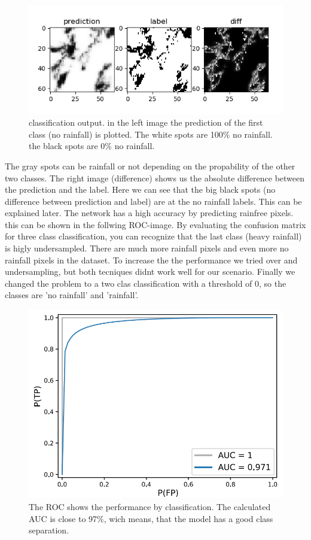 \documentclass[oneside]{htwg-report}
\begin{document}
\begin{figure}[ht]
\centering
\includegraphics[width=\linewidth]{../pics/categorical_crossentropy_hidden-softmax_output-softmax_above_3072}
\caption{classification output. in the left image the prediction of the first class (no rainfall) is plotted. The white spots are 100\% no rainfall. the black spots are 0\% no rainfall.}
\end{figure}


The gray spots can be rainfall or not depending on the propability of the other two classes. The right image (difference) shows us the absolute difference between the prediction and the label.
Here we can see that the big black spots (no difference between prediction and label) are at the no rainfall labels. This can be explained later. 
The network has a high accuracy by predicting rainfree pixels. this can be shown in the follwing ROC-image. 
By evaluating the confusion matrix for three class classification, you can recognize that the last class (heavy rainfall) is higly undersampled. 
There are much more rainfall pixels and even more no rainfall pixels in the dataset. To increase the the performance we tried over and undersampling, but both tecniques didnt work well for our scenario.
Finally we changed the problem to a two clas classification with a threshold of 0, so the classes are 'no rainfall' and 'rainfall'.


\begin{figure}[ht]
\centering
\includegraphics[width=\linewidth]{../pics/roc-curve-RESIZED_TXT}
\caption{The ROC shows the performance by classification. The calculated AUC is close to 97\%, wich means, that the model has a good class separation.}
\end{figure}
\end{document}
